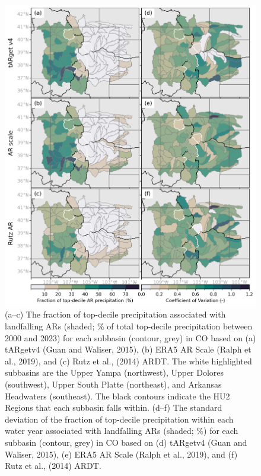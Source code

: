 \documentclass[draft]{agujournal2019}
\begin{document}
\begin{figure}
\noindent\includegraphics[width=\textwidth, height=\textheight, keepaspectratio]{fig8.png}
\caption{(a–c) The fraction of top-decile precipitation associated with landfalling ARs (shaded; \% of total top-decile precipitation between 2000 and 2023) for each subbasin (contour, grey) in CO based on (a) tARgetv4 (Guan and Waliser, 2015), (b) ERA5 AR Scale (Ralph et al., 2019), and (c) Rutz et al., (2014) ARDT. The white highlighted subbasins are the Upper Yampa (northwest), Upper Dolores (southwest), Upper South Platte (northeast), and Arkansas Headwaters (southeast). The black contours indicate the HU2 Regions that each subbasin falls within. (d–f) The standard deviation of the fraction of top-decile precipitation within each water year associated with landfalling ARs (shaded; \%) for each subbasin (contour, grey) in CO based on (d)  tARgetv4 (Guan and Waliser, 2015), (e) ERA5 AR Scale (Ralph et al., 2019), and (f) Rutz et al., (2014) ARDT. }
\label{fig:choropleth}
\end{figure}
\end{document}
